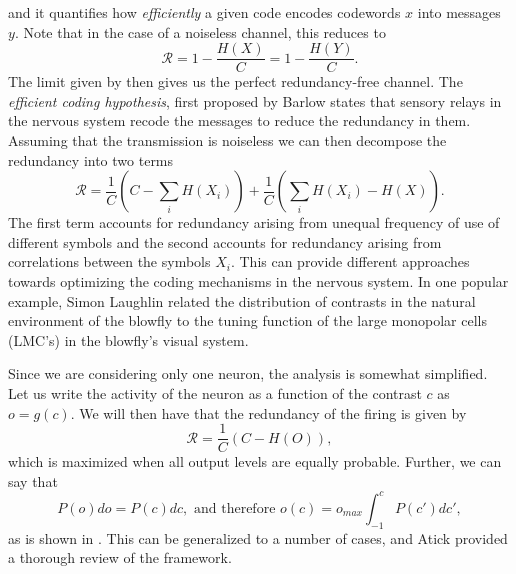 and it quantifies how {\em efficiently} a given code encodes codewords $x$ into messages $y$. Note that in the case of a noiseless channel, this reduces to 
$$
\mathcal{R} = 1 - \frac{H(X)}{C}= 1 - \frac{H(Y)}{C}.
$$
The limit given by  then gives us the perfect redundancy-free channel. The {\em efficient coding hypothesis}, first proposed by Barlow\cite{Barlow1961} states that sensory relays in the nervous system recode the	messages to reduce the redundancy in them. Assuming that the transmission is noiseless we can then decompose the redundancy into two terms\cite{Atick1992}
$$
\mathcal{R} = \frac{1}{C} \left(C - \sum_i H(X_i) \right) + \frac{1}{C}\left(\sum_i H(X_i) -H(X)\right).
$$
The first term accounts for redundancy arising from unequal frequency of use of different symbols and the second accounts for redundancy arising from correlations between the symbols $X_i$. This can provide different approaches towards optimizing the coding mechanisms in the nervous system. In one popular example, Simon Laughlin related the distribution of contrasts in the natural environment of the blowfly to the tuning function of the large monopolar cells (LMC's) in the blowfly's visual system\cite{Laughlin1981}.


Since we are considering only one neuron, the analysis is somewhat simplified. Let us write the activity of the neuron as a function of the contrast $c$ as $o = g(c)$. We will then have that the redundancy of the firing is given by
$$
\mathcal{R} = \frac{1}{C} \left(C - H(O) \right),
$$
which is maximized when all output levels are equally probable. Further, we can say that
$$
P(o) do = P(c) dc, \textrm{ and therefore } o(c) = o_{max} \int_{-1}^c P(c') dc',
$$
as is shown in . This can be generalized to a number of cases, and Atick\cite{Atick1992} provided a thorough review of the framework.

